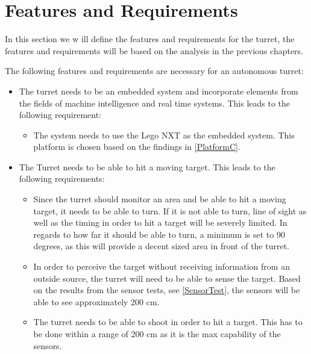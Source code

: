 \section{Features and Requirements}
In this section we w  ill define the features and requirements for the turret,
the features and requirements will be based on the analysis in the previous
chapters.\nl

The following features and requirements are necessary for an autonomous turret:
\begin{itemize}
  \item The turret needs to be an embedded system and incorporate elements from
  the fields of machine intelligence and real time systems. This leads to the
  following requirement:
  \begin{itemize}
    \item The system needs to use the Lego NXT as the embedded
    system. This platform is chosen based on the findings in
    \autoref{PlatformC}. 
  \end{itemize}
  \item The Turret needs to be able to hit a moving target. This leads to the
  following requirements:
  \begin{itemize}
    \item Since the turret should monitor an area and be able to hit a moving
    target, it needs to be able to turn. If it is not able to turn, line of
    sight as well as the timing in order to hit a target will be severely
    limited. In regards to how far it should be able to turn, a minimum is set
    to 90 degrees, as this will provide a decent sized area in front of the turret.
    \item In order to perceive the target without receiving information from an
    outside source, the turret will need to be able to sense the target. Based
    on the results from the sensor tests, see \autoref{SensorTest}, the sensors
    will be able to see approximately 200 cm.    
    \item The turret needs to be able to shoot in order to hit a
    target. This has to be done within a range of 200 cm as it is the max
    capability of the sensors. 
    

\end{itemize}
\end{itemize}
